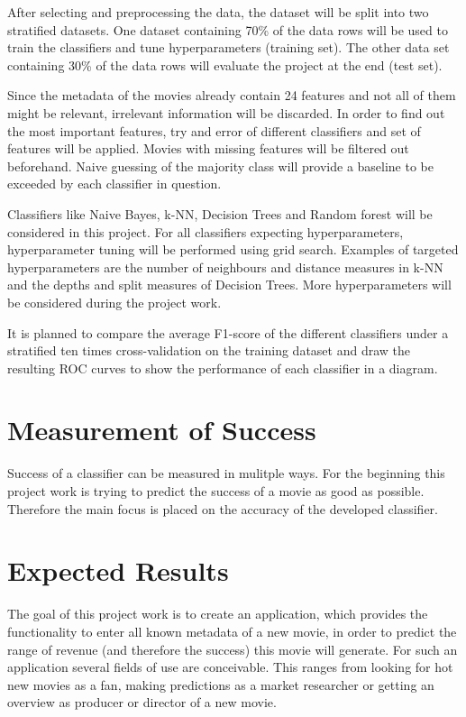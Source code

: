 After selecting and preprocessing the data, the dataset will be split into two stratified datasets. One dataset containing 70\% of the data rows will be used to train the classifiers and tune hyperparameters (training set). The other data set containing 30\% of the data rows will evaluate the project at the end (test set). 

Since the metadata of the movies already contain 24 features and not all of them might be relevant, irrelevant information will be discarded. In order to find out the most important features, try and error of different classifiers and set of features will be applied. Movies with missing features will be filtered out beforehand. Naive guessing of the majority class will provide a baseline to be exceeded by each classifier in question.

Classifiers like Naive Bayes, k-NN, Decision Trees and Random forest will be considered in this project. For all classifiers expecting hyperparameters, hyperparameter tuning will be performed using grid search. Examples of targeted hyperparameters are the number of neighbours and distance measures in k-NN and the depths and split measures of Decision Trees. More hyperparameters will be considered during the project work.

It is planned to compare the average F1-score of the different classifiers under a stratified ten times cross-validation on the training dataset and draw the resulting ROC curves to show the performance of each classifier in a diagram.


\section{Measurement of Success}
Success of a classifier can be measured in mulitple ways. For the beginning this project work is trying to predict the success of a movie as good as possible. Therefore the main focus is placed on the accuracy of the developed classifier.

\section{Expected Results}
The goal of this project work is to create an application, which provides the functionality to enter all known metadata of a new movie, in order to predict the range of revenue (and therefore the success) this movie will generate. For such an application several fields of use are conceivable. This ranges from looking for hot new movies as a fan, making predictions as a market researcher or getting an overview as producer or director of a new movie.






